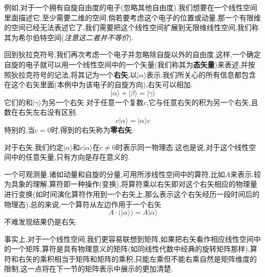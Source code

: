 \documentclass[lang=cn,newtx,10pt,scheme=chinese,thmcnt=section]{elegantbook}
\begin{document}
例如,对于一个拥有自旋自由度的电子(忽略其他自由度).我们想要在一个线性空间里面描述它,至少需要二维的空间.倘若要考虑这个电子的位置或动量,那一个有限维的空间已经无法表述它了,我们需要把这个线性空间扩展到无限维线性空间,我们称其为希尔伯特空间(\textit{注意这二者并不等价}).

回到狄拉克符号,我们再次考虑一个电子并忽略除自旋以外的自由度.这样,一个确定自旋的电子就可以用一个线性空间中的一个矢量(我们称其为\textbf{态矢量})来表述,并按照狄拉克符号的记法,将其记为一个\textbf{右矢},以$|\alpha\rangle$表示.我们所关心的所有信息都包含在这个右矢里面(本例中为该电子的自旋方向),右矢可以相加.
\begin{equation}
	|\alpha\rangle+|\beta\rangle=|\gamma\rangle 
\end{equation}
它们的和$|\gamma\rangle$为另一个右矢.对于任意一个复数$c$,它与任意右矢的积为另一个右矢,且数在右矢左右没有区别.
\begin{equation}
	c|\alpha\rangle=|\alpha\rangle c
\end{equation}
特别的,当$c=0$时,得到的右矢称为\textbf{零右矢}.

对于右矢,我们约定$|\alpha\rangle$和$c|\alpha\rangle$在$c\ne0$时表示同一物理态.这也是说,对于这个线性空间中的任意矢量,只有方向是存在意义的.

一个可观测量.诸如动量和自旋的分量,可用所涉线性空间中的算符,比如$A$来表示.较为具象的理解,算符即一种操作(变换),将算符乘以右矢即对这个右矢相应的物理量进行变换(如时间演化算符作用到一个右矢上,那么表示这个右矢经历一段时间后的物理态).总的来说,一个算符从左边作用于一个右矢
\begin{equation}
	A\cdot(|\alpha\rangle)=A|\alpha\rangle 
\end{equation}
不难发现结果仍是右矢.\\
\begin{remark}
	事实上,对于一个线性空间,我们更容易联想到矩阵,如果把右矢看作相应线性空间中的一个矩阵,算符是具有物理意义的矩阵(如同线性代数中经典的旋转矩阵那样),算符和右矢的乘积相当于矩阵和矩阵的乘积,只能左乘但不能右乘自然是矩阵维度的限制,这一点将在下一节的矩阵表示中展示的更加清楚.
\end{remark}
\end{document}
